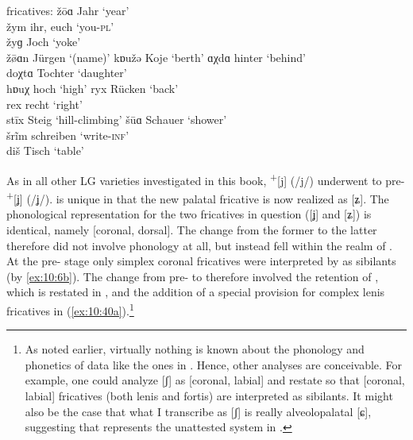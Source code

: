 \begin{xlist}
\ea%
\label{ex:10:39} fricatives:
\ea\label{ex:10:39a} žōɑ \tab [ʑoːɐ] \tab Jahr \tab ‘year’ \\
    žym \tab [ʑym] \tab ihr, euch \tab ‘you\textsc{{}-pl}’ \\
    žyɡ \tab [ʑyg] \tab Joch \tab ‘yoke’ \\
    ž\={ø}ɑn \tab [ʑøːɐn] \tab Jürgen \tab ‘(name)’ 
\ex\label{ex:10:39b} kɒužə \tab [kɒuʑə] \tab Koje \tab ‘berth’ 
\ex\label{ex:10:39c} ɑχdɑ \tab [ɑxdɐ] \tab hinter \tab ‘behind’ \\
    doχtɑ \tab [doxtɐ] \tab Tochter \tab ‘daughter’ \\
    hɒuχ \tab [hɒux] \tab hoch \tab ‘high’ 
\ex\label{ex:10:39d} ryx \tab [ryç] \tab Rücken \tab ‘back’ \\
    rex \tab [reç] \tab recht \tab ‘right’ \\
    stīx \tab [stiːç] \tab Steig \tab ‘hill-climbing’ 
\ex\label{ex:10:39e} šūɑ \tab [ʃuːɐ] \tab Schauer \tab ‘shower’ \\
    šrĩm \tab [ʃrĩm] \tab schreiben \tab ‘write\textsc{{}-inf}’ \\
    diš \tab [diʃ] \tab Tisch \tab ‘table’ 
    \z
\z 

As in all other LG varieties investigated in this book,  \textsuperscript{+}[j] (/j/) underwent  to pre- \textsuperscript{+}[ʝ] (/ʝ/).  is unique in that the new palatal fricative is now realized as [ʑ]. The phonological representation for the two fricatives in question ([ʝ] and [ʑ]) is identical, namely [coronal, dorsal]. The change from the former to the latter therefore did not involve phonology at all, but instead fell within the realm of . At the pre- stage only simplex coronal fricatives were interpreted by  as sibilants (by \ref{ex:10:6b}). The change from pre- to  therefore involved the retention of , which is restated in , and the addition of a special provision for complex lenis fricatives in (\ref{ex:10:40a}).\footnote{{As noted earlier, virtually nothing is known about the phonology and phonetics of data like the ones in . Hence, other analyses are conceivable. For example, one could analyze [ʃ] as [coronal, labial] and restate  so that [coronal, labial] fricatives (both lenis and fortis) are interpreted as sibilants. It might also be the case that what I transcribe as [ʃ] is really alveolopalatal [ɕ], suggesting that  represents the unattested system in .} }


\end{xlist}
